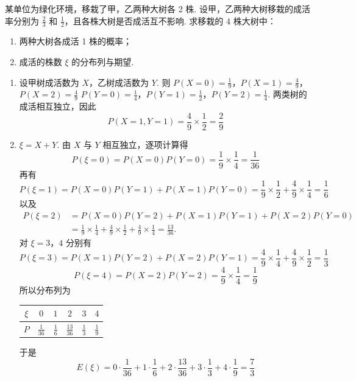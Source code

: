\begin{problem}
某单位为绿化环境，移栽了甲，乙两种大树各 2 株. 设甲，乙两种大树移栽的成活率分别为 \(\frac{2}{3}\) 和 \(\frac{1}{2}\)，且各株大树是否成活互不影响. 求移栽的 4 株大树中：

\begin{enumerate}
\item 两种大树各成活 1 株的概率；
\item 成活的株数 \(\xi\) 的分布列与期望.
\end{enumerate}

\begin{solution}
\begin{enumerate}
\item 设甲树成活数为 \(X\)，乙树成活数为 \(Y\). 则
\(P(X=0)=\frac19\)，\(P(X=1)=\frac49\)，\(P(X=2)=\frac49\)
\(P(Y=0)=\frac14\)，\(P(Y=1)=\frac12\)，\(P(Y=2)=\frac14\).
两类树的成活相互独立，因此
\[
P(X=1,Y=1)=\frac49\times\frac12=\frac29
\]
\item \(\xi=X+Y\). 由 \(X\) 与 \(Y\) 相互独立，逐项计算得
\[
P(\xi=0)=P(X=0)P(Y=0)=\frac19\times\frac14=\frac1{36}
\]
再有
\[
P(\xi=1)=P(X=0)P(Y=1)+P(X=1)P(Y=0)
=\frac19\times\frac12+\frac49\times\frac14=\frac16
\]
以及
\[
\begin{aligned}
P(\xi=2)&=P(X=0)P(Y=2)+P(X=1)P(Y=1)+P(X=2)P(Y=0)\\
&=\frac19\times\frac14+\frac49\times\frac12+\frac49\times\frac14=\frac{13}{36}.
\end{aligned}
\]
对 \(\xi=3\)，\(4\) 分别有
\[
P(\xi=3)=P(X=1)P(Y=2)+P(X=2)P(Y=1)
=\frac49\times\frac14+\frac49\times\frac12=\frac13
\]
\[
P(\xi=4)=P(X=2)P(Y=2)=\frac49\times\frac14=\frac19
\]
所以分布列为
\begin{center}
\begin{tabular}{c|ccccc}
\(\xi\)&\(0\)&\(1\)&\(2\)&\(3\)&\(4\)\\
\hline
\(P\)&\(\frac1{36}\)&\(\frac16\)&\(\frac{13}{36}\)&\(\frac13\)&\(\frac19\)
\end{tabular}
\end{center}
于是
\[
E(\xi)=0\cdot\frac1{36}+1\cdot\frac16+2\cdot\frac{13}{36}
+3\cdot\frac13+4\cdot\frac19=\frac73
\]
\end{enumerate}
\end{solution}
\end{problem}

